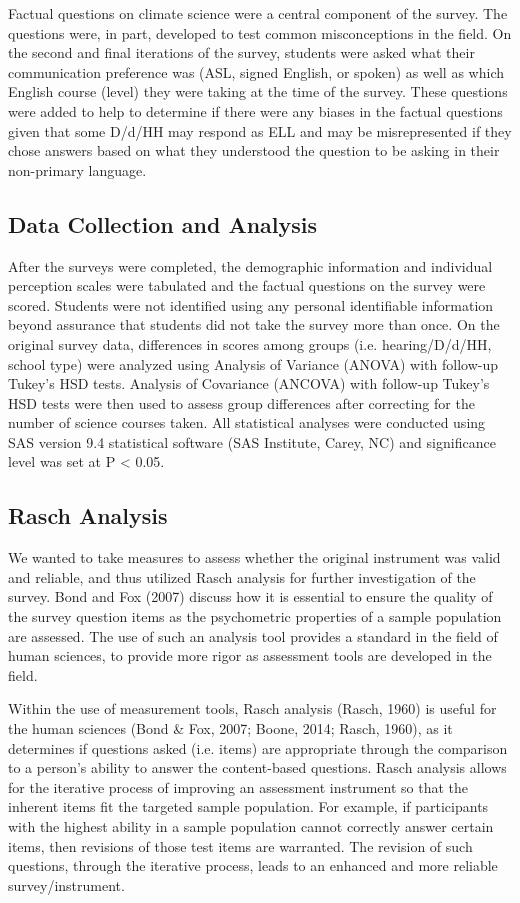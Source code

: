\documentclass[11.5pt]{sig-alternate} %
\begin{document}
\begin{large}
Factual questions on climate science were a central component of the survey. The questions were, in part, developed to test common misconceptions in the field. On the second and final iterations of the survey, students were asked what their communication preference was (ASL, signed English, or spoken) as well as which English course (level) they were taking at the time of the survey. These questions were added to help to determine if there were any biases in the factual questions given that some D/d/HH may respond as ELL and may be misrepresented if they chose answers based on what they understood the question to be asking in their non-primary language.

\subsection*{Data Collection and Analysis}

After the surveys were completed, the demographic information and individual perception scales were tabulated and the factual questions on the survey were scored. Students were not identified using any personal identifiable information beyond assurance that students did not take the survey more than once. On the original survey data, differences in scores among groups (i.e. hearing/D/d/HH, school type) were analyzed using Analysis of Variance (ANOVA) with follow-up Tukey’s HSD tests.  Analysis of Covariance (ANCOVA) with follow-up Tukey’s HSD tests were then used to assess group differences after correcting for the number of science courses taken. All statistical analyses were conducted using SAS version 9.4 statistical software (SAS Institute, Carey, NC) and significance level was set at P < 0.05.

\subsection*{Rasch Analysis}

We wanted to take measures to assess whether the original instrument was valid and reliable, and thus utilized Rasch analysis for further investigation of the survey. Bond and Fox (2007) discuss how it is essential to ensure the quality of the survey question items as the psychometric properties of a sample population are assessed. The use of such an analysis tool provides a standard in the field of human sciences, to provide more rigor as assessment tools are developed in the field. 

Within the use of measurement tools, Rasch analysis (Rasch, 1960) is useful for the human sciences (Bond \& Fox, 2007; Boone, 2014; Rasch, 1960), as it determines if questions asked (i.e. items) are appropriate through the comparison to a person’s ability to answer the content-based questions. Rasch analysis allows for the iterative process of improving an assessment instrument so that the inherent items fit the targeted sample population. For example, if participants with the highest ability in a sample population cannot correctly answer certain items, then revisions of those test items are warranted. The revision of such questions, through the iterative process, leads to an enhanced and more reliable survey/instrument. 


\end{large}
\end{document}
